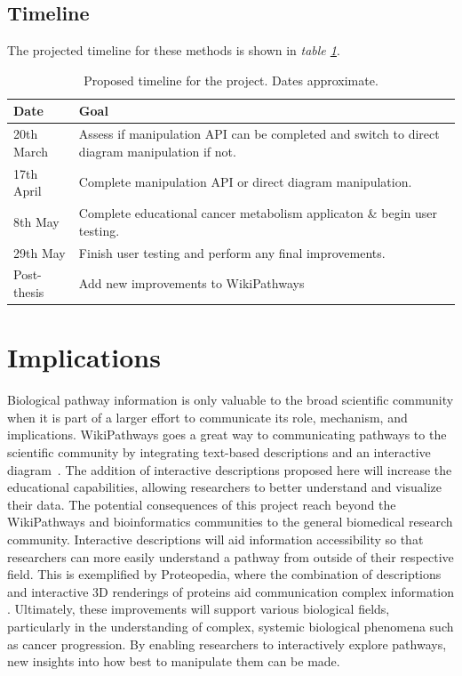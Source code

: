 \documentclass[a4paper,12pt,twoside]{apa}
\begin{document}
\clearpage

\FloatBarrier
\subsection{Timeline}
The projected timeline for these methods is shown in \textit{table \ref{tbl:timeline}}.
\begin{table}[h]
  \centering
  \caption{Proposed timeline for the project. Dates approximate.}
  \label{tbl:timeline}
  \begin{tabularx}{0.9\textwidth}{|X|X|}
    \hline
    \textbf{Date} & \textbf{Goal} \\ \hline
    20th March & Assess if manipulation API can be completed and switch to direct diagram manipulation if not. \\ \hline
    17th April & Complete manipulation API or direct diagram manipulation. \\ \hline
    8th May & Complete educational cancer metabolism applicaton \& begin user testing. \\ \hline
    29th May & Finish user testing and perform any final improvements. \\ \hline
    Post-thesis & Add new improvements to WikiPathways \\ \hline
  \end{tabularx}
\end{table}

\section{Implications}

Biological pathway information is only valuable to the broad scientific community when it is part of a larger effort to communicate its role, mechanism, and implications. WikiPathways goes a great way to communicating pathways to the scientific community by integrating text-based descriptions and an interactive diagram~\cite{pico2008wikipathways}. The addition of interactive descriptions proposed here will increase the educational capabilities, allowing researchers to better understand and visualize their data. The potential consequences of this project reach beyond the WikiPathways and bioinformatics communities to the general biomedical research community. Interactive descriptions will aid information accessibility so that researchers can more easily understand a pathway from outside of their respective field. This is exemplified by Proteopedia, where the combination of descriptions and interactive 3D renderings of proteins aid communication complex information \cite{hodis2008proteopedia}. Ultimately, these improvements will support various biological fields, particularly in the understanding of complex, systemic biological phenomena such as cancer progression. By enabling researchers to interactively explore pathways, new insights into how best to manipulate them can be made.



\end{document}
